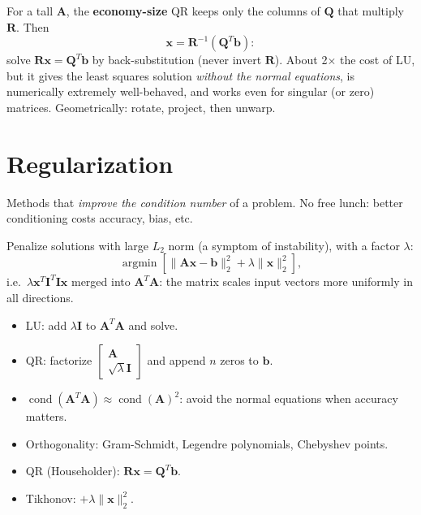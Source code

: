 \documentclass[11pt,a4paper,openany]{book}
\begin{document}
\begin{propbox}[title=Least squares with QR]
For a tall $\mathbf{A}$, the \textbf{economy-size} QR keeps only the columns of $\mathbf{Q}$
that multiply $\mathbf{R}$. Then
\[
\mathbf{x} = \mathbf{R}^{-1}(\mathbf{Q}^T\mathbf{b}):
\]
solve $\mathbf{R}\mathbf{x} = \mathbf{Q}^T\mathbf{b}$ by back-substitution (never invert
$\mathbf{R}$). About 2$\times$ the cost of LU, but it gives the least squares solution
\emph{without the normal equations}, is numerically extremely well-behaved, and works even for
singular (or zero) matrices. Geometrically: rotate, project, then unwarp.
\end{propbox}


\section{Regularization}

\begin{defnbox}[title=Regularization]
Methods that \emph{improve the condition number} of a problem. No free lunch: better
conditioning costs accuracy, bias, etc.
\end{defnbox}

\begin{defnbox}[title=Tikhonov regularization]
Penalize solutions with large $L_2$ norm (a symptom of instability), with a factor $\lambda$:
\[
\operatorname{argmin}\left[\|\mathbf{A}\mathbf{x} - \mathbf{b}\|_2^2 +
\lambda\|\mathbf{x}\|_2^2\right],
\]
i.e.\ $\lambda\mathbf{x}^T\mathbf{I}^T\mathbf{I}\mathbf{x}$ merged into
$\mathbf{A}^T\mathbf{A}$: the matrix scales input vectors more uniformly in all directions.
\begin{itemize}
  \item LU: add $\lambda\mathbf{I}$ to $\mathbf{A}^T\mathbf{A}$ and solve.
  \item QR: factorize $\begin{bmatrix} \mathbf{A} \\ \sqrt{\lambda}\mathbf{I} \end{bmatrix}$
        and append $n$ zeros to $\mathbf{b}$.
\end{itemize}
\end{defnbox}

\begin{keybox}[title=Summary]
\begin{itemize}
  \item $\operatorname{cond}(\mathbf{A}^T\mathbf{A}) \approx \operatorname{cond}(\mathbf{A})^2$:
        avoid the normal equations when accuracy matters.
  \item Orthogonality: Gram-Schmidt, Legendre polynomials, Chebyshev points.
  \item QR (Householder): $\mathbf{R}\mathbf{x} = \mathbf{Q}^T\mathbf{b}$.
  \item Tikhonov: $+\lambda\|\mathbf{x}\|_2^2$.
\end{itemize}
\end{keybox}
\end{document}
